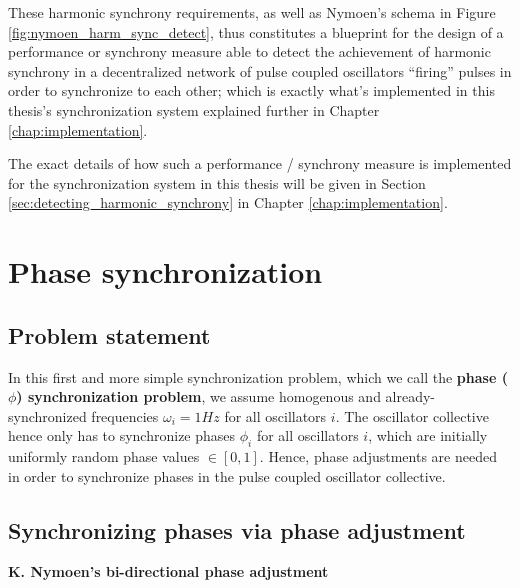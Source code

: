	These harmonic synchrony requirements, as well as Nymoen's schema in Figure \ref{fig:nymoen_harm_sync_detect}, thus constitutes a blueprint for the design of a performance or synchrony measure able to detect the achievement of harmonic synchrony in a decentralized network of pulse coupled oscillators ``firing'' pulses in order to synchronize to each other; which is exactly what's implemented in this thesis's synchronization system explained further in Chapter \ref{chap:implementation}.
	
	The exact details of how such a performance / synchrony measure is implemented for the synchronization system in this thesis will be given in Section \ref{sec:detecting_harmonic_synchrony} in Chapter \ref{chap:implementation}.
	



\section{Phase synchronization} %
\label{sec:nymoen_phase_updates}

	\subsection{Problem statement}

	In this first and more simple synchronization problem, which we call the \textbf{phase ($\phi$) synchronization problem}, we assume homogenous and already-synchronized frequencies $\omega_i=1Hz$ for all oscillators $i$. The oscillator collective hence only has to synchronize phases $\phi_i$ for all oscillators $i$, which are initially uniformly random phase values $\in [0,1]$. Hence, phase adjustments are needed in order to synchronize phases in the pulse coupled oscillator collective.

	
	\subsection{Synchronizing phases via phase adjustment}

	\textbf{K. Nymoen's bi-directional phase adjustment} \nl %
	\label{subsec:nymoen_phase_adjust}

